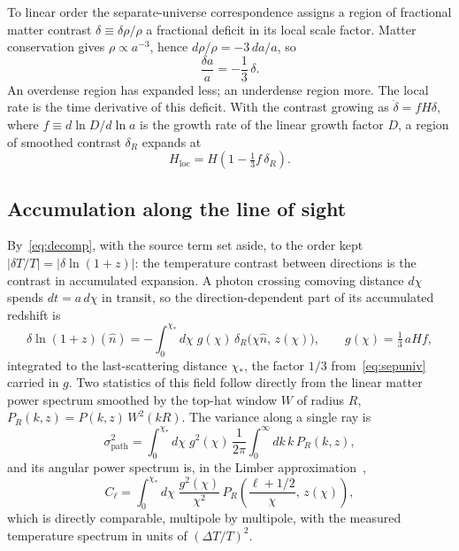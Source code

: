 \documentclass[11pt,a4paper]{article}
\begin{document}
To linear order the separate-universe correspondence assigns a region of fractional matter contrast $\delta \equiv \delta\rho/\rho$ a fractional deficit in its local scale factor. Matter conservation gives $\rho \propto a^{-3}$, hence $d\rho/\rho = -3\,da/a$, so
\begin{equation}
\frac{\delta a}{a} = -\frac{1}{3}\,\delta .
\label{eq:sepuniv}
\end{equation}
An overdense region has expanded less; an underdense region more. The local rate is the time derivative of this deficit. With the contrast growing as $\dot\delta = fH\delta$, where $f\equiv d\ln D/d\ln a$ is the growth rate of the linear growth factor $D$, a region of smoothed contrast $\delta_R$ expands at
\begin{equation}
H_{\mathrm{loc}} = H\left(1-\tfrac13 f\,\delta_R\right).
\label{eq:localrate}
\end{equation}

\subsection{Accumulation along the line of sight}

By~\eqref{eq:decomp}, with the source term set aside, to the order kept $|\delta T/T| = |\delta\ln(1+z)|$: the temperature contrast between directions is the contrast in accumulated expansion. A photon crossing comoving distance $d\chi$ spends $dt=a\,d\chi$ in transit, so the direction-dependent part of its accumulated redshift is
\begin{equation}
\delta\ln(1+z)(\hat n) = -\int_0^{\chi_*} d\chi\; g(\chi)\,\delta_R\big(\chi\hat n,\,z(\chi)\big),
\qquad g(\chi)=\tfrac13\,a H f ,
\label{eq:lineint}
\end{equation}
integrated to the last-scattering distance $\chi_*$, the factor $1/3$ from~\eqref{eq:sepuniv} carried in $g$. Two statistics of this field follow directly from the linear matter power spectrum smoothed by the top-hat window $W$ of radius $R$, $P_R(k,z)=P(k,z)\,W^{2}(kR)$. The variance along a single ray is
\begin{equation}
\sigma^{2}_{\mathrm{path}} = \int_0^{\chi_*} d\chi\; g^{2}(\chi)\,\frac{1}{2\pi}\int_0^\infty dk\,k\,P_R(k,z),
\label{eq:sigmapath}
\end{equation}
and its angular power spectrum is, in the Limber approximation~\cite{Limber1953},
\begin{equation}
C_\ell = \int_0^{\chi_*} d\chi\;\frac{g^{2}(\chi)}{\chi^{2}}\,P_R\!\left(\frac{\ell+1/2}{\chi},\,z(\chi)\right),
\label{eq:limber}
\end{equation}
which is directly comparable, multipole by multipole, with the measured temperature spectrum in units of $(\Delta T/T)^{2}$.
\end{document}
